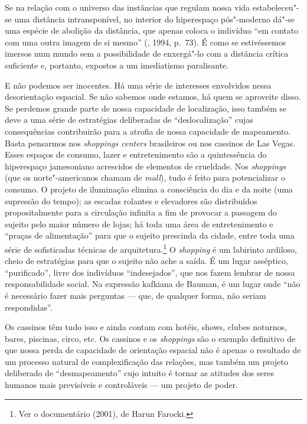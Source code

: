 Se na relação com o universo das instâncias que regulam nossa vida
estabeleceu"-se uma distância intransponível, no interior do hiperespaço
pós"-moderno dá"-se uma espécie de abolição da distância, que apenas
coloca o indivíduo ``em contato com uma outra imagem de si mesmo''
(, 1994, p.~73). É como se estivéssemos imersos num mundo sem a
possibilidade de enxergá"-lo com a distância crítica suficiente e,
portanto, expostos a um imediatismo paralisante.

E não podemos ser inocentes. Há uma série de interesses envolvidos nessa
desorientação espacial. Se não sabemos onde estamos, há quem se
aproveite disso. Se perdemos grande parte de nossa capacidade de
localização, isso também se deve a uma série de estratégias deliberadas
de ``deslocalização'' cujas consequências contribuirão para a atrofia de
nossa capacidade de mapeamento. Basta pensarmos nos \emph{shoppings
centers} brasileiros ou nos cassinos de Las Vegas. Esses espaços de
consumo, lazer e entretenimento são a quintessência do hiperespaço
jamesoniano acrescidos de elementos de crueldade. Nos \emph{shoppings} (que os
norte"-americanos chamam de \emph{mall}), tudo é feito para potencializar
o consumo. O projeto de iluminação elimina a consciência do dia e da
noite (uma supressão do tempo); as escadas rolantes e elevadores são
distribuídos propositalmente para a circulação infinita a fim de
provocar a passagem do sujeito pelo maior número de lojas; há toda uma
área de entretenimento e ``praças de alimentação'' para que o sujeito
prescinda da cidade, entre toda uma série de sofisticadas técnicas de
arquitetura.\footnote{Ver o documentário {} (2001), de Harun Farocki.} O \emph{shopping} é um labirinto
ardiloso, cheio de estratégias para que o sujeito não ache a saída. É um lugar asséptico, ``purificado'', livre dos indivíduos ``indesejados'', que nos fazem lembrar de nossa responsabilidade social. Na expressão kafkiana de Bauman, é um lugar onde ``não é necessário fazer mais perguntas --- que, de qualquer forma, não seriam respondidas''.

Os cassinos têm tudo isso e ainda contam com hotéis, shows, clubes
noturnos, bares, piscinas, circo, etc. Os cassinos e os \emph{shoppings} são o
exemplo definitivo de que nossa perda de capacidade de orientação
espacial não é apenas o resultado de um processo natural de
complexificação das relações, mas também um projeto deliberado de
``desmapeamento'' cujo intuito é tornar as atitudes dos seres humanos
mais previsíveis e controláveis --- um projeto de poder.

